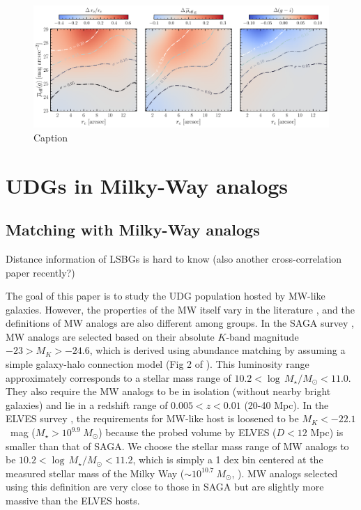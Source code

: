 \documentclass[twocolumn,astrosymb,twocolappendix]{aastex631}
\begin{document}
\begin{CJK*}{UTF8}{gbsn}
\begin{figure}
	\vbox{ 
		\centering
		\includegraphics[width=1\linewidth]{meas_error_spergel.pdf}
	}
    \caption{Caption}
    \label{fig:meas_err}
\end{figure}

\section{UDGs in Milky-Way analogs}

\subsection{Matching with Milky-Way analogs}\label{sec:match}

Distance information of LSBGs is hard to know \citep{Kadowaki2021,Greene2022,Zaritsky2022} (also another cross-correlation paper recently?)

The goal of this paper is to study the UDG population hosted by MW-like galaxies. However, the properties of the MW itself vary in the literature \citep{Licquia2015,Bland-Hawthorn2016}, and the definitions of MW analogs are also different among groups. In the SAGA survey \citep{SAGA-I,SAGA-II}, MW analogs are selected based on their absolute $K$-band magnitude $-23 > M_K > -24.6$, which is derived using abundance matching by assuming a simple galaxy-halo connection model (Fig 2 of \citealt{SAGA-I}). This luminosity range approximately corresponds to a stellar mass range of $10.2 < \log\, M_\star/M_\odot < 11.0$. They also require the MW analogs to be in isolation (without nearby bright galaxies) and lie in a redshift range of $0.005 < z < 0.01$ (20-40 Mpc). In the ELVES survey \citep{ELVES-I,ELVES-II,CarlstenELVES2022}, the requirements for MW-like host is loosened to be $M_K < -22.1$~mag ($M_\star > 10^{9.9}\ M_\odot$) because the probed volume by ELVES ($D<12$ Mpc) is smaller than that of SAGA. We choose the stellar mass range of MW analogs to be $10.2 < \log\, M_\star/M_\odot < 11.2$, which is simply a 1 dex bin centered at the measured stellar mass of the Milky Way ($\sim 10^{10.7}\ M_\odot$, \citealt{Licquia2015}). MW analogs selected using this definition are very close to those in SAGA but are slightly more massive than the ELVES hosts.


\end{CJK*}
\end{document}
